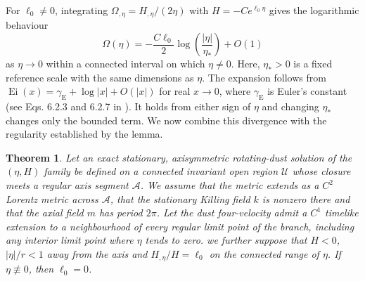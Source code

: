 \documentclass[amsmath,amsfonts,amssymb,aps,pra,superscriptaddress,10pt]{revtex4-2}
\numberwithin{equation}{section}
\theoremstyle{plain}
\newtheorem{theorem}{Theorem}
\theoremstyle{definition}
\theoremstyle{remark}
\theoremstyle{definition}
\newcommand{\ellzero}{\ell_0}
\begin{document}
For $\ellzero\neq 0$, integrating $\Omega_{,\eta}=H_{,\eta}/(2\eta)$ with $H=-Ce^{\ellzero\eta}$ gives the logarithmic behaviour
\begin{equation}\label{constantellomegaaxis}
\Omega(\eta)=-\frac{C\ellzero}{2}\log{\left(\frac{|\eta|}{\eta_*}\right)}+O(1)
\end{equation}
as $\eta\to 0$ within a connected interval on which $\eta\neq 0$. Here,  $\eta_*>0$ is a fixed reference scale with the same dimensions as $\eta$. The expansion follows from $\operatorname{Ei}(x)=\gamma_{\mathrm{E}}+\log|x|+O(|x|)$ for real $x\to 0$, where $\gamma_{\mathrm{E}}$ is Euler's constant (see Eqs. 6.2.3 and 6.2.7 in \cite{NISTDLMF}). It holds from either sign of $\eta$ and changing $\eta_*$ changes only the bounded term. We now combine this divergence with the regularity established by the lemma.

\begin{theorem}
Let an exact stationary, axisymmetric rotating-dust solution of the $(\eta,H)$ family be defined on a connected invariant open region $\mathcal{U}$ whose closure meets a regular axis segment $\mathcal{A}$. We assume that the metric extends as a $C^2$ Lorentz metric across $\mathcal{A}$, that the stationary Killing field $k$ is nonzero there and that the axial field $m$ has period $2\pi$. Let the dust four-velocity admit a $C^1$ timelike extension to a neighbourhood of every regular limit point of the branch, including any interior limit point where $\eta$ tends to zero. we further suppose that $H<0$, $|\eta|/r<1$ away from the axis and $H_{,\eta}/H=\ellzero$ on the connected range of $\eta$. If $\eta\not\equiv 0$, then $\ellzero=0$.
\end{theorem}
\end{document}
